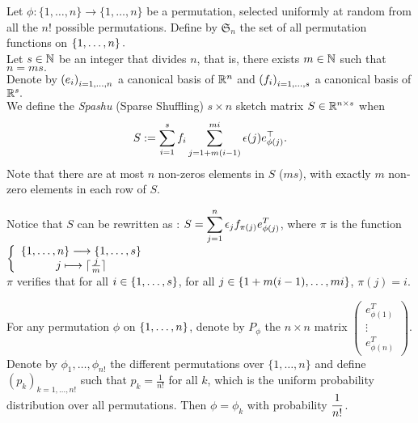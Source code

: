 Let $\phi: \{1,\ldots, n\} \rightarrow \{1,\ldots, n\}$ be a permutation, selected uniformly at random from all the $n!$ possible permutations. Define by $\mathfrak{S}_{n}$ the set of all permutation functions on $\left\{1,\dots,n\right\}.$\\
 Let $s\in {\mathbb N}$ be an integer that divides $n$, that is, there exists $m \in {\mathbb N}$ such that $n = ms.$\\





Denote by $\left(e_{i}\right)_{i=1,\dots,n}$ a canonical basis of ${\mathbb R}^{n}$  and $\left(f_{i}\right)_{i=1,\dots,s}$ a canonical basis of ${\mathbb R}^{s}.$\\ 
 We define the \emph{Spashu} (Sparse Shuffling) $s\times n$ sketch matrix $S \in {\mathbb R}^{n \times s}$  when
 \[S := \displaystyle\sum_{i=1}^s f_i \sum_{j=1+m(i-1)}^{mi} \epsilon(j)e_{\phi(j)}^\top.\]
 Note that there are at most $n$ non-zeros elements in $S$ ($m s$), with exactly $m$ non-zero elements in each row of $S$.

 
 
Notice that $S$ can be rewritten as : $S = \displaystyle\sum_{j=1}^{n} \epsilon_{j}f_{\pi(j)}e_{\phi(j)}^{T} $, where $\pi$ is the function $\left\{\begin{array}{c}\left\{1,\dots,n\right\}\longrightarrow \left\{1,\dots,s\right\}\\ j \longmapsto \lceil\frac{j}{m} \rceil\end{array}\right.$\\
 
 $\pi$ verifies that for all $i \in \left\{1,\dots,s\right\}$, for all $j \in \left\{1+m (i-1),\dots,m i\right\}$, $\pi(j) = i. $
 
 For any permutation $\phi$ on $\left\{1,\dots,n\right\}$, denote by $P_{\phi}$ the $n\times n$ matrix $ \begin{pmatrix} e_{\phi(1)}^{T} \\ \vdots \\ e_{\phi(n)}^{T} \end{pmatrix} $.\\
 Denote by $\phi_{1},\dots,\phi_{n!}$ the different permutations over $\{1,\ldots, n\}$ and define $(p_{k})_{k=1,\dots,n!}$ such that $p_{k} = \frac{1}{n!}$ for all $k$, which is the uniform probability distribution over all permutations.  Then $\phi = \phi_{k}$ with probability $\displaystyle \frac{1}{n!}$.\\\\
 
